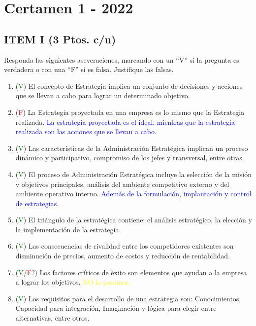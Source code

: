 \documentclass{templateNote}
\begin{document}
\newpage
\section{Certamen 1 - 2022} 
\subsection*{ITEM I (3 Ptos. c/u)}
Responda las siguientes aseveraciones, marcando con un “V” si la pregunta es verdadera o con una “F” si es 
falsa. Justifique las falsas.

\begin{enumerate}
    \item (\textcolor{green}{V}) El concepto de Estrategia implica un conjunto de decisiones y acciones que se llevan a cabo para lograr un determinado objetivo.
    
    \item (\textcolor{red}{F}) La Estrategia proyectada en una empresa es lo mismo que la Estrategia realizada.\newline
    \textcolor{blue}{
        La estrategia proyectada es el ideal, mientras que la estrategia realizada son las acciones que se llevan a cabo.
    }
    
    \item (\textcolor{green}{V}) Las características de la Administración Estratégica implican un proceso dinámico y participativo, compromiso de los jefes y transversal, entre otras.
    
    \item (\textcolor{green}{V}) El proceso de Administración Estratégica incluye la selección de la misión y objetivos principales, análisis del ambiente competitivo externo y del ambiente operativo interno.\newline
    \textcolor{blue}{
        Además de la formulación, implantación y control de estrategias.
    }
    \item (\textcolor{green}{V}) El triángulo de la estratégica contiene: el análisis estratégico, la elección y la implementación de la estrategia.
    
    \item (\textcolor{green}{V}) Las consecuencias de rivalidad entre los competidores existentes son disminución de precios, aumento de costos y reducción de rentabilidad.
    
    \item (\textcolor{green}{V}/\textcolor{red}{F}?) Los factores críticos de éxito son elementos que ayudan a la empresa a lograr los objetivos. 
    \textcolor{yellow}{
        NO lo pasamos.
    }
    \item (\textcolor{green}{V}) Los requisitos para el desarrollo de una estrategia son: Conocimientos, Capacidad para integración, Imaginación y lógica para elegir entre alternativas, entre otros.
    

\end{enumerate}
\end{document}
